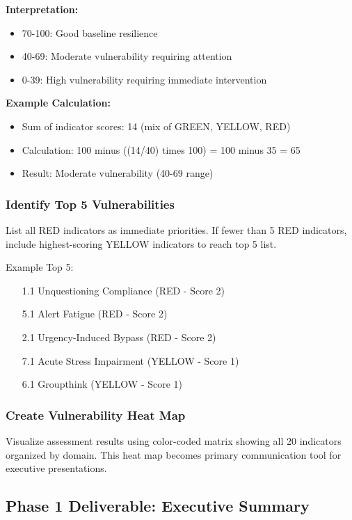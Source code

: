 \documentclass[11pt,a4paper]{article}
\begin{document}
\textbf{Interpretation:}
\begin{itemize}
\item 70-100: Good baseline resilience
\item 40-69: Moderate vulnerability requiring attention
\item 0-39: High vulnerability requiring immediate intervention
\end{itemize}

\textbf{Example Calculation:}
\begin{itemize}
\item Sum of indicator scores: 14 (mix of GREEN, YELLOW, RED)
\item Calculation: 100 minus ((14/40) times 100) = 100 minus 35 = 65
\item Result: Moderate vulnerability (40-69 range)
\end{itemize}

\subsubsection{Identify Top 5 Vulnerabilities}

List all RED indicators as immediate priorities. If fewer than 5 RED indicators, include highest-scoring YELLOW indicators to reach top 5 list.

Example Top 5:
\begin{enumerate}
\item[1.1] Unquestioning Compliance (RED - Score 2)
\item[5.1] Alert Fatigue (RED - Score 2)
\item[2.1] Urgency-Induced Bypass (RED - Score 2)
\item[7.1] Acute Stress Impairment (YELLOW - Score 1)
\item[6.1] Groupthink (YELLOW - Score 1)
\end{enumerate}

\subsubsection{Create Vulnerability Heat Map}

Visualize assessment results using color-coded matrix showing all 20 indicators organized by domain. This heat map becomes primary communication tool for executive presentations.

\subsection{Phase 1 Deliverable: Executive Summary}
\end{document}
